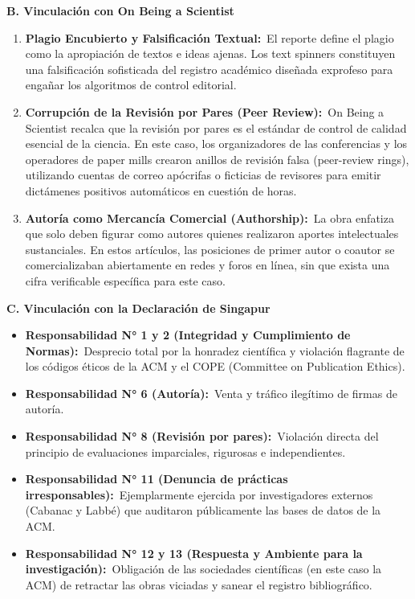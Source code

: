 \documentclass[12pt,a4paper]{article}
\newcommand{\itemlabel}[3]{\textbf{#1#2}~#3}
\begin{document}
\bigskip
\noindent\textbf{B. Vinculación con On Being a Scientist}
\begin{enumerate}
\item \itemlabel{Plagio Encubierto y Falsificación Textual}{:}{El reporte define el plagio como la apropiación de textos e ideas ajenas. Los text spinners constituyen una falsificación sofisticada del registro académico diseñada exprofeso para engañar los algoritmos de control editorial.}
\item \itemlabel{Corrupción de la Revisión por Pares (Peer Review)}{:}{On Being a Scientist recalca que la revisión por pares es el estándar de control de calidad esencial de la ciencia. En este caso, los organizadores de las conferencias y los operadores de paper mills crearon anillos de revisión falsa (peer-review rings), utilizando cuentas de correo apócrifas o ficticias de revisores para emitir dictámenes positivos automáticos en cuestión de horas.}
\item \itemlabel{Autoría como Mercancía Comercial (Authorship)}{:}{La obra enfatiza que solo deben figurar como autores quienes realizaron aportes intelectuales sustanciales. En estos artículos, las posiciones de primer autor o coautor se comercializaban abiertamente en redes y foros en línea, sin que exista una cifra verificable específica para este caso.}
\end{enumerate}
\bigskip
\noindent\textbf{C. Vinculación con la Declaración de Singapur}
\begin{itemize}
\item \itemlabel{Responsabilidad N° 1 y 2 (Integridad y Cumplimiento de Normas)}{:}{Desprecio total por la honradez científica y violación flagrante de los códigos éticos de la ACM y el COPE (Committee on Publication Ethics).}
\item \itemlabel{Responsabilidad N° 6 (Autoría)}{:}{Venta y tráfico ilegítimo de firmas de autoría.}
\item \itemlabel{Responsabilidad N° 8 (Revisión por pares)}{:}{Violación directa del principio de evaluaciones imparciales, rigurosas e independientes.}
\item \itemlabel{Responsabilidad N° 11 (Denuncia de prácticas irresponsables)}{:}{Ejemplarmente ejercida por investigadores externos (Cabanac y Labbé) que auditaron públicamente las bases de datos de la ACM.}
\item \itemlabel{Responsabilidad N° 12 y 13 (Respuesta y Ambiente para la investigación)}{:}{Obligación de las sociedades científicas (en este caso la ACM) de retractar las obras viciadas y sanear el registro bibliográfico.}
\end{itemize}
\end{document}
